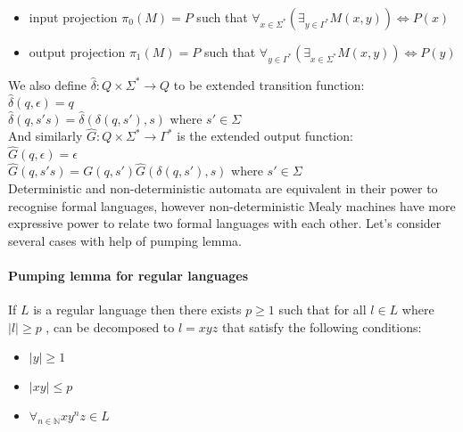 \documentclass[12pt]{article}
\begin{document}
\begin{itemize}
	\item input projection $\pi_0(M) = P$ such that $\forall_{x\in\Sigma^*} (\exists_{y\in\Gamma^*}M(x,y) ) \iff P(x) $
	\item output projection  $\pi_1(M) = P$ such that $\forall_{y\in\Gamma^*} (\exists_{x\in\Sigma^*}M(x,y) ) \iff P(y) $
\end{itemize} 
We also define $\hat{\delta} : Q \times \Sigma^* \rightarrow Q$ to be extended transition function: \\
$\hat{\delta}(q,\epsilon) = q$ \\
$\hat{\delta}(q,s's) = \hat{\delta}(\delta(q,s'),s)$ where $s' \in \Sigma$\\
And similarly $\hat{G}:Q\times\Sigma^*\rightarrow\Gamma^*$ is the extended output function: \\
$\hat{G}(q,\epsilon) = \epsilon$ \\
$\hat{G}(q,s's) = G(q,s')\hat{G}(\delta(q,s'),s)$ where $s' \in \Sigma$\\
Deterministic and non-deterministic automata are equivalent in their power to recognise formal languages, however non-deterministic Mealy machines have more expressive power to relate two formal languages with each other. Let's consider several cases with help of pumping lemma. 

\paragraph{Pumping lemma for regular languages}
If $L$ is a regular language then there exists $p\ge1$  such that for all $l \in L$ where $\vert l \vert \ge p$ , can be decomposed to $l = xyz$ that satisfy the following conditions:
\begin{itemize}
	\item $\vert y \vert \ge 1$ 
	\item $\vert xy \vert \le p$ 
	\item $\forall_{n\in \mathbb{N}}  xy^nz \in L$ 
\end{itemize}
\end{document}
